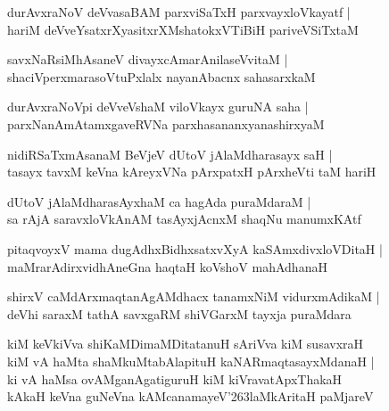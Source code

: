 \documentclass[twoside,12pt,openright]{book}
\def\S{\char'263}
\newcounter{shloka}[chapter]
\begin{document}
\begin{shloka}%
durAvxraNoV deVvasaBAM parxviSaTxH parxvayxloVkayatf |\\
hariM deVveYsatxrXyasitxrXMshatokxVTiBiH pariveVSiTxtaM 
\end{shloka}

\begin{shloka}%
savxNaRsiMhAsaneV divayxcAmarAnilaseVvitaM |\\
shaciVperxmarasoVtuPxlalx nayanAbacnx sahasarxkaM
\end{shloka}

\begin{shloka}%
durAvxraNoVpi deVveVshaM viloVkayx guruNA saha |\\
parxNanAmAtamxgaveRVNa parxhasananxyanashirxyaM 
\end{shloka}

\begin{shloka}%
nidiRSaTxmAsanaM BeVjeV dUtoV jAlaMdharasayx saH |\\
tasayx tavxM keVna kAreyxVNa pArxpatxH pArxheVti taM hariH 
\end{shloka}

\begin{shloka}%
dUtoV jAlaMdharasAyxhaM ca hagAda puraMdaraM |\\
sa rAjA saravxloVkAnAM tasAyxjAcnxM shaqNu manumxKAtf 
\end{shloka}

\begin{shloka}%
pitaqvoyxV mama dugAdhxBidhxsatxvXyA kaSAmxdivxloVDitaH |\\
maMrarAdirxvidhAneGna haqtaH koVshoV mahAdhanaH 
\end{shloka}

\begin{shloka}%
shirxV caMdArxmaqtanAgAMdhacx tanamxNiM vidurxmAdikaM |\\
deVhi saraxM tathA savxgaRM shiVGarxM tayxja puraMdara 
\end{shloka}

\begin{shloka}%
kiM keVkiVva shiKaMDimaMDitatanuH sAriVva kiM susavxraH \\
kiM vA haMta shaMkuMtabAlapituH kaNARmaqtasayxMdanaH |\\
ki vA haMsa ovAMganAgatiguruH kiM kiVravatApxThakaH \\
kAkaH keVna guNeVna kAMcanamayeV\S laMkAritaH paMjareV
\end{shloka}
\end{document}
